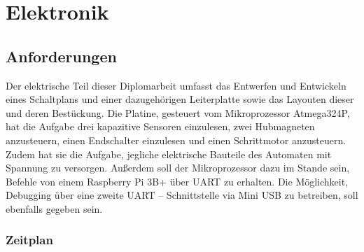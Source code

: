 \usepackage{natbib}

\chapter{Elektronik}


\section{Anforderungen}

Der elektrische Teil dieser Diplomarbeit umfasst das Entwerfen und Entwickeln eines Schaltplans und einer dazugehörigen Leiterplatte sowie das Layouten dieser und deren Bestückung.
Die Platine, gesteuert vom Mikroprozessor Atmega324P, hat die Aufgabe drei kapazitive Sensoren einzulesen, zwei Hubmagneten anzusteuern, einen Endschalter einzulesen und einen Schrittmotor anzusteuern.
Zudem hat sie die Aufgabe, jegliche elektrische Bauteile des Automaten mit Spannung zu versorgen.
Außerdem soll der Mikroprozessor dazu im Stande sein, Befehle von einem Raspberry Pi 3B+ über UART zu erhalten.
Die Möglichkeit, Debugging über eine zweite UART – Schnittstelle via Mini USB zu betreiben, soll ebenfalls gegeben sein.

\subsection{Zeitplan}

